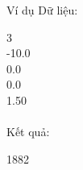 Ví dụ
Dữ liệu:  

   3   
\\   -10.0   
\\   0.0   
\\   0.0   
\\   1.50   
\\


\\   Kết quả:  

   1882